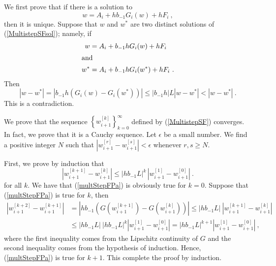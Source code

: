 \begin{rmkList}
\begin{enumerate}
We first prove that if there is a solution to
\begin{equation} \label{MultistepSFsol}
w = A_i + h b_{-1} G_i(w) + h F_i \ ,
\end{equation}
then it is unique.  Suppose that $w$ and $w^\ast$ are two distinct
solutions of (\ref{MultistepSFsol}); namely, if
\begin{align*}
w &= A_i + b_{-1} h G_i(w) + h F_i\\
\intertext{and}
w^\ast &= A_i + b_{-1} h G_i(w^\ast) + h F_i \ .
\end{align*}
Then
\[
|w - w^\ast| = |b_{-1} h (G_i(w) - G_i(w^\ast))|
\leq |b_{-1} h| L |w -w^\ast| < |w - w^\ast| \ .
\]
This is a contradiction.

We prove that the sequence
$\displaystyle \left\{ w_{i+1}^{[k]} \right\}_{k=0}^\infty$
defined by (\ref{MultistepSF}) converges.  In fact, we prove that it
is a Cauchy sequence.  Let $\epsilon$ be a small number.  We find a
positive integer $N$  such that
$\displaystyle \left|w_{i+1}^{[r]} - w_{i+1}^{[s]} \right|< \epsilon$ whenever 
$r,s \geq N$.

First, we prove by induction that
\begin{equation} \label{multStepFPa}
\left| w_{i+1}^{[k+1]} - w_{i+1}^{[k]} \right|
\leq |h b_{-1} L|^k\, \left|w_{i+1}^{[1]} - w_{i+1}^{[0]} \right| \ .
\end{equation}
for all $k$.  We have that (\ref{multStepFPa}) is obviously true for
$k=0$.  Suppose that (\ref{multStepFPa}) is true for $k$, then
\begin{align*}
\left|w_{i+1}^{[k+2]} - w_{i+1}^{[k+1]}\right| &=
\left|h b_{-1} \left( G\left(w_{i+1}^{[k+1]}\right)
- G\left(w_{i+1}^{[k]} \right) \right)\right|
\leq |h b_{-1} L|\ \left| w_{i+1}^{[k+1]} - w_{i+1}^{[k]} \right| \\
&\leq |h b_{-1} L|\ |h b_{-1} L|^k \left|w_{i+1}^{[1]} - w_{i+1}^{[0]} \right|
= |h b_{-1} L|^{k+1} \left| w_{i+1}^{[1]} -w_{i+1}^{[0]} \right| \ ,
\end{align*}
where the first inequality comes from the Lipschitz continuity of $G$
and the second inequality comes from the hypothesis of induction.  Hence,
(\ref{multStepFPa}) is true for $k+1$.  This complete the proof by
induction.


\end{enumerate}
\end{rmkList}
